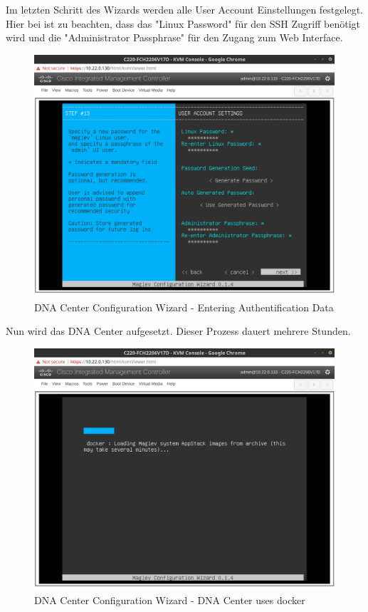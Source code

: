 Im letzten Schritt des Wizards werden alle User Account Einstellungen festgelegt. Hier bei ist zu beachten, dass das "Linux Password" für den SSH Zugriff benötigt wird und die "Administrator Passphrase" für den Zugang zum Web Interface.
 
\begin{figure}[H]
	\centering
	\includegraphics[height=9cm]{img/sc_003.png}
	\caption{DNA Center Configuration Wizard - Entering Authentification Data}
	\label{fig:dna-center-install-step-13}
\end{figure}

Nun wird das DNA Center aufgesetzt. Dieser Prozess dauert mehrere Stunden. 

\begin{figure}[H]
	\centering
	\includegraphics[height=9cm]{img/sc_004.png}
	\caption{DNA Center Configuration Wizard - DNA Center uses docker}
	\label{fig:dna-center-install-step-install}
\end{figure}


